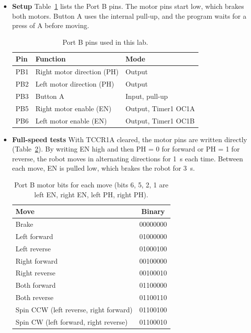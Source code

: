 \documentclass[11pt]{article}
\begin{document}
\begin{itemize}

\item \textbf{Setup} Table~\ref{tab:pins} lists the Port B pins. The motor pins start low, which brakes both motors. Button A uses the internal pull-up, and the program waits for a press of A before moving.

\begin{table}[H]
  \centering
  \caption{Port B pins used in this lab.}
  \label{tab:pins}
  \begin{tabular}{lll}
    \toprule
    Pin & Function & Mode \\
    \midrule
    PB1 & Right motor direction (PH) & Output \\
    PB2 & Left motor direction (PH) & Output \\
    PB3 & Button A & Input, pull-up \\
    PB5 & Right motor enable (EN) & Output, Timer1 OC1A \\
    PB6 & Left motor enable (EN) & Output, Timer1 OC1B \\
    \bottomrule
  \end{tabular}
\end{table}

\item \textbf{Full-speed tests} With TCCR1A cleared, the motor pins are written directly (Table~\ref{tab:patterns}). By writing EN high and then PH = 0 for forward or PH = 1 for reverse, the robot moves in alternating directions for 1~s each time. Between each move, EN is pulled low, which brakes the robot for 3~s.

\begin{table}[H]
  \centering
  \caption{Port B motor bits for each move (bits 6, 5, 2, 1 are left EN, right EN, left PH, right PH).}
  \label{tab:patterns}
  \begin{tabular}{lc}
    \toprule
    Move & Binary \\
    \midrule
    Brake & 00000000 \\
    Left forward & 01000000 \\
    Left reverse & 01000100 \\
    Right forward & 00100000 \\
    Right reverse & 00100010 \\
    Both forward & 01100000 \\
    Both reverse & 01100110 \\
    Spin CCW (left reverse, right forward) & 01100100 \\
    Spin CW (left forward, right reverse) & 01100010 \\
    \bottomrule
  \end{tabular}
\end{table}


\end{itemize}
\end{document}
